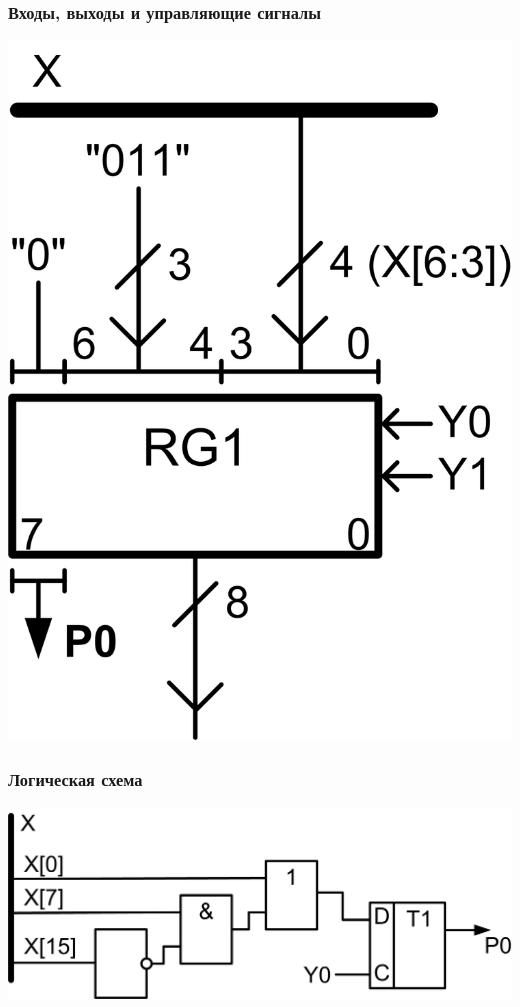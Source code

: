 \begin{frame}
    \frametitle{Входы, выходы и управляющие сигналы}
    \begin{center}
        \includegraphics[height=.8\textheight]{fig/controls}
    \end{center}
\end{frame}

\begin{frame}
    \frametitle{Логическая схема}
    \begin{center}
        \includegraphics[width=.8\textwidth]{fig/logic}
    \end{center}
\end{frame}

